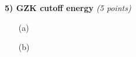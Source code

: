 \vspace*{0.25in}

\textbf{5)  GZK cutoff energy} \hfill \textit{(5 points)}
\begin{itemize}
\item[(a)]{
}
\item[(b)]{
}

\end{itemize}




